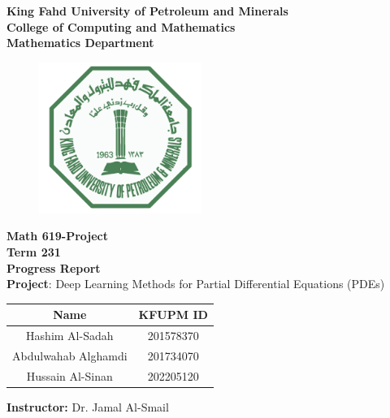\graphicspath{{./images}}

\begin{center}
    \doublespacing
    {\Large \textbf{King Fahd University of Petroleum and Minerals} }\\ 
    {\large \textbf{
    College of Computing and Mathematics\\
    Mathematics Department 
    } } 
\end{center} 

\begin{figure}[h]
    \centering
    \includegraphics[width=200px]{images/KFUPM_LOGO}
\end{figure}

\begin{center}\onehalfspacing
    \Large \textbf{Math 619-Project}\\
    \normalsize \textbf{Term 231} \\
    \Large \textbf{Progress Report}\\
    \textbf{Project}: Deep Learning Methods for Partial Differential Equations (PDEs)
\end{center}
\vspace{1em}
\large
\begin{center}
\bgroup
\def\arraystretch{1.3}
\begin{tabular}{|c|c|}
    \hline
    \textbf{Name} & \textbf{KFUPM ID} \\
    \hline
    Hashim Al-Sadah & 201578370\\
    \hline
    Abdulwahab Alghamdi & 201734070\\
    \hline
    Hussain Al-Sinan & 202205120\\
    \hline 
\end{tabular}
\egroup
\end{center}
\vspace{1em}
\begin{center}
    \textbf{Instructor:} Dr. Jamal Al-Smail
\end{center}
\normalsize


